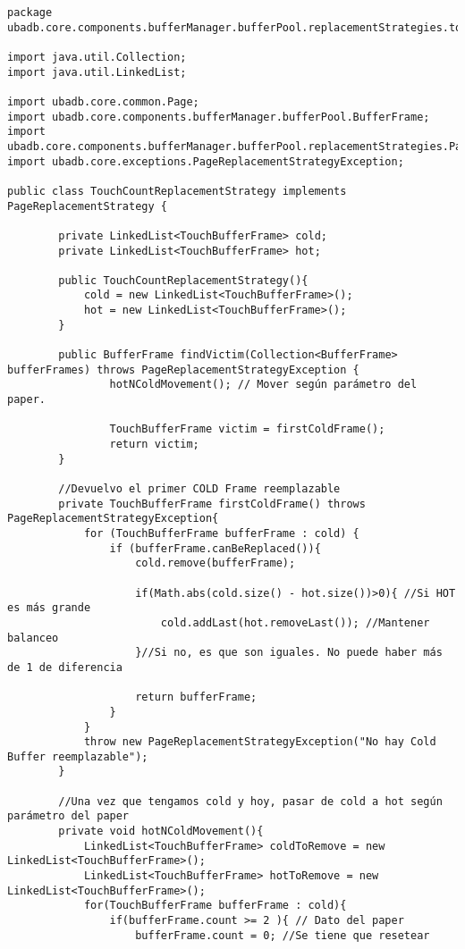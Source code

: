 \begin{lstlisting}
package ubadb.core.components.bufferManager.bufferPool.replacementStrategies.touchcount;

import java.util.Collection;
import java.util.LinkedList;

import ubadb.core.common.Page;
import ubadb.core.components.bufferManager.bufferPool.BufferFrame;
import ubadb.core.components.bufferManager.bufferPool.replacementStrategies.PageReplacementStrategy;
import ubadb.core.exceptions.PageReplacementStrategyException;

public class TouchCountReplacementStrategy implements PageReplacementStrategy {

		private LinkedList<TouchBufferFrame> cold;
		private LinkedList<TouchBufferFrame> hot;
		
		public TouchCountReplacementStrategy(){
			cold = new LinkedList<TouchBufferFrame>();
			hot = new LinkedList<TouchBufferFrame>();
		}
		
        public BufferFrame findVictim(Collection<BufferFrame> bufferFrames) throws PageReplacementStrategyException {
        		hotNColdMovement(); // Mover según parámetro del paper.
        		
        		TouchBufferFrame victim = firstColdFrame();
                return victim;
        }
        
        //Devuelvo el primer COLD Frame reemplazable
        private TouchBufferFrame firstColdFrame() throws PageReplacementStrategyException{
        	for (TouchBufferFrame bufferFrame : cold) {
        		if (bufferFrame.canBeReplaced()){
        			cold.remove(bufferFrame);
        			
        			if(Math.abs(cold.size() - hot.size())>0){ //Si HOT es más grande
        				cold.addLast(hot.removeLast()); //Mantener balanceo
        			}//Si no, es que son iguales. No puede haber más de 1 de diferencia
        			
        			return bufferFrame;
        		}
        	}
        	throw new PageReplacementStrategyException("No hay Cold Buffer reemplazable");
        }
        
        //Una vez que tengamos cold y hoy, pasar de cold a hot según parámetro del paper
        private void hotNColdMovement(){
			LinkedList<TouchBufferFrame> coldToRemove = new LinkedList<TouchBufferFrame>();
			LinkedList<TouchBufferFrame> hotToRemove = new LinkedList<TouchBufferFrame>();
        	for(TouchBufferFrame bufferFrame : cold){
        		if(bufferFrame.count >= 2 ){ // Dato del paper
        			bufferFrame.count = 0; //Se tiene que resetear
        			

\end{lstlisting}
